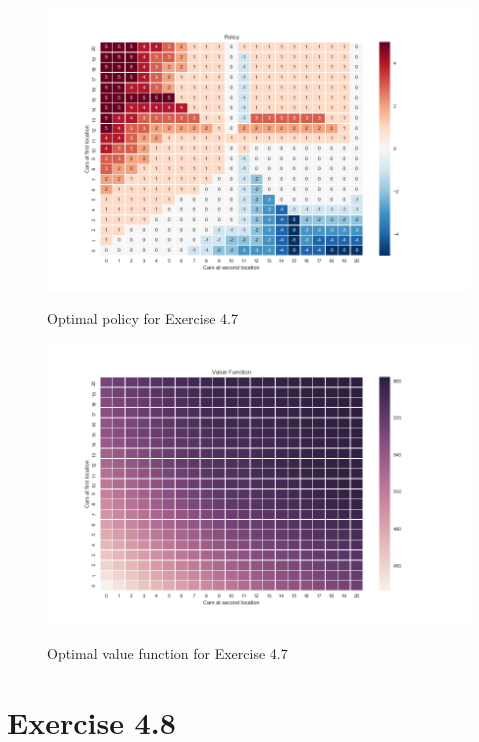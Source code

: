 \documentclass[a4paper,11pt]{article}
\numberwithin{equation}{section}
\theoremstyle{remark}
\begin{document}
\begin{figure}[h]
	\centering
	\caption{Optimal policy for Exercise 4.7}
	\includegraphics[scale=0.6]{policy_4_7.png}
	\label{fig:policy_4_7}
\end{figure}

\begin{figure}[h]
	\centering
	\caption{Optimal value function for Exercise 4.7}
	\includegraphics[scale=0.6]{value_function_4_7.png}
	\label{fig:value_function_4_7}
\end{figure}


\section{Exercise 4.8}
\end{document}
